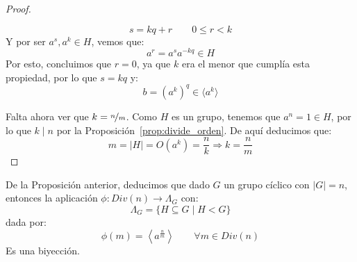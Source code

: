 \begin{prop}
\begin{proof}
\begin{description}
                \begin{equation*}
                    s = kq + r \qquad 0\leq r < k
                \end{equation*}
                Y por ser $a^s, a^k\in H$, vemos que:
                \begin{equation*}
                    a^r = a^s a^{-kq} \in H
                \end{equation*}
                Por esto, concluimos que $r=0$, ya que $k$ era el menor que cumplía esta propiedad, por lo que $s = kq$ y:
                \begin{equation*}
                    b = {(a^k)}^{q} \in \langle a^k \rangle 
                \end{equation*}
        \end{description}
        Falta ahora ver que $k = \nicefrac{n}{m}$. Como $H$ es un grupo, tenemos que $a^n = 1 \in H$, por lo que $k\mid n$ por la Proposición~\ref{prop:divide_orden}. De aquí deducimos que:
        \begin{equation*}
             m = |H| = O(a^k)= \dfrac{n}{k} \Longrightarrow k = \dfrac{n}{m}
        \end{equation*}
    \end{proof}
\end{prop}

\begin{observacion}
    De la Proposición anterior, deducimos que dado $G$ un grupo cíclico con $|G| = n$, entonces la aplicación $\phi:Div(n)\to \Lambda_G$ con:
    \begin{equation*}
        \Lambda_G = \{H \subseteq G \mid H < G\}
    \end{equation*}
    dada por:
    \begin{equation*}
        \phi(m) = \left\langle a^{\frac{n}{m}} \right\rangle \qquad \forall m\in Div(n)
    \end{equation*}
    Es una biyección.
\end{observacion}

